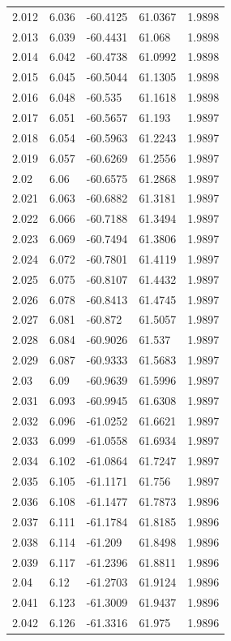 \begin{tabular}{lllll}
2.012 & 6.036 & -60.4125 & 61.0367 & 1.9898 \\
2.013 & 6.039 & -60.4431 & 61.068 & 1.9898 \\
2.014 & 6.042 & -60.4738 & 61.0992 & 1.9898 \\
2.015 & 6.045 & -60.5044 & 61.1305 & 1.9898 \\
2.016 & 6.048 & -60.535 & 61.1618 & 1.9898 \\
2.017 & 6.051 & -60.5657 & 61.193 & 1.9897 \\
2.018 & 6.054 & -60.5963 & 61.2243 & 1.9897 \\
2.019 & 6.057 & -60.6269 & 61.2556 & 1.9897 \\
2.02 & 6.06 & -60.6575 & 61.2868 & 1.9897 \\
2.021 & 6.063 & -60.6882 & 61.3181 & 1.9897 \\
2.022 & 6.066 & -60.7188 & 61.3494 & 1.9897 \\
2.023 & 6.069 & -60.7494 & 61.3806 & 1.9897 \\
2.024 & 6.072 & -60.7801 & 61.4119 & 1.9897 \\
2.025 & 6.075 & -60.8107 & 61.4432 & 1.9897 \\
2.026 & 6.078 & -60.8413 & 61.4745 & 1.9897 \\
2.027 & 6.081 & -60.872 & 61.5057 & 1.9897 \\
2.028 & 6.084 & -60.9026 & 61.537 & 1.9897 \\
2.029 & 6.087 & -60.9333 & 61.5683 & 1.9897 \\
2.03 & 6.09 & -60.9639 & 61.5996 & 1.9897 \\
2.031 & 6.093 & -60.9945 & 61.6308 & 1.9897 \\
2.032 & 6.096 & -61.0252 & 61.6621 & 1.9897 \\
2.033 & 6.099 & -61.0558 & 61.6934 & 1.9897 \\
2.034 & 6.102 & -61.0864 & 61.7247 & 1.9897 \\
2.035 & 6.105 & -61.1171 & 61.756 & 1.9897 \\
2.036 & 6.108 & -61.1477 & 61.7873 & 1.9896 \\
2.037 & 6.111 & -61.1784 & 61.8185 & 1.9896 \\
2.038 & 6.114 & -61.209 & 61.8498 & 1.9896 \\
2.039 & 6.117 & -61.2396 & 61.8811 & 1.9896 \\
2.04 & 6.12 & -61.2703 & 61.9124 & 1.9896 \\
2.041 & 6.123 & -61.3009 & 61.9437 & 1.9896 \\
2.042 & 6.126 & -61.3316 & 61.975 & 1.9896 \\

\end{tabular}
